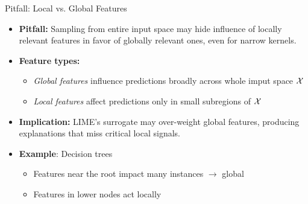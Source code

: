 \documentclass[10pt,compress,t,notes=noshow, xcolor=table]{beamer}
\begin{document}
\begin{frame}{Pitfall: Local vs. Global Features }

\begin{itemize}%
	\item<1-> \textbf{Pitfall:} Sampling from entire input space may hide influence of locally relevant features in favor of globally relevant ones, even for narrow kernels.
 \item<1-> \textbf{Feature types:}
  \begin{itemize}
    \item \emph{Global features} influence predictions broadly across whole imput space $\mathcal{X}$
    \item \emph{Local features} affect predictions only in small subregions of $\mathcal{X}$
  \end{itemize}
  
  \item<2-> \textbf{Implication:} LIME’s surrogate may over-weight global features, producing explanations that miss critical local signals.
	\item<3-> \textbf{Example}: Decision trees
    \begin{itemize}
        \item Features near the root impact many instances $\rightarrow$ global
        \item Features in lower nodes act locally
    \end{itemize}
\end{itemize}

\end{frame}
\end{document}
